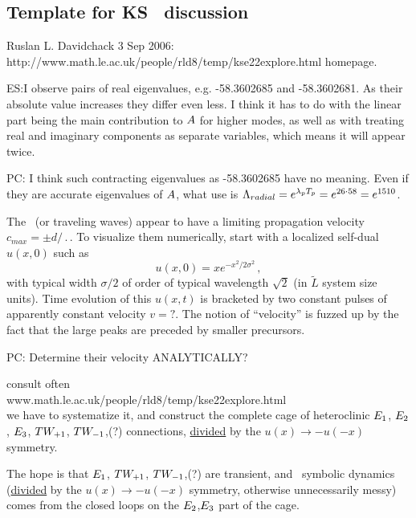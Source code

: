 \subsection{Template for KS \eqva\ discussion}

Ruslan L. Davidchack 3 Sep 2006:
http://www.math.le.ac.uk/people/rld8/temp/kse22explore.html homepage.


ES:{I observe pairs of real eigenvalues,
e.g. -58.3602685 and -58.3602681. As their absolute
value increases they differ even less.
I think it has to do with the linear part being the main
contribution to $A$ for higher modes, as well as
with treating real and imaginary components
as separate variables, which means it will appear twice.
        }

PC: {I think such contracting eigenvalues as -58.3602685 have no meaning.
Even if they are accurate eigenvalues of $A$,
what use is
$\Lambda_{radial} =  e^{\lambda_p {T_{p}}} = e^{26\cdot58} = e^{1510}$.
        }

The \reqva\ (or traveling waves) appear to have a limiting propagation
velocity $c_{max} = \pm d/\period{}$.
To visualize them numerically,
start with a localized self-dual $u(x,0)$ such as
\[
u(x,0) = x e^{- x^2/2\sigma^2}
\,,
\]
with typical width $\sigma/2$ of order of typical wavelength
$\sqrt{2}$ (in $\tilde{L}$ system size units).
Time evolution of this  $u(x,t)$ is bracketed by two constant
pulses of apparently constant velocity $v=?$.
The notion of ``velocity''
is fuzzed up by the fact that the large peaks are preceded
by smaller precursors.

PC: {Determine their velocity ANALYTICALLY?}

consult often
\\
        www.math.le.ac.uk/people/rld8/temp/kse22explore.html
\\
we have to systematize it, and
construct the complete cage of heteroclinic $E_{1}$, $E_{2}$, $E_{3}$,
$TW_{+1}$,
$TW_{-1}$,(?)
connections, \underline{divided} by the $u(x) \to - u(-x)$ symmetry.

The hope is that $E_{1}$,
$TW_{+1}$,
$TW_{-1}$,(?) are transient, and \rpo\ symbolic
dynamics (\underline{divided} by the $u(x) \to - u(-x)$ symmetry, otherwise
unnecessarily messy) comes from the closed loops on
the $E_{2}$,$E_{3}$ part of the cage.



